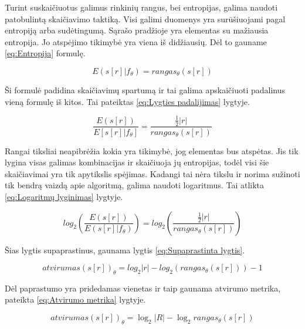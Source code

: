 \documentclass{VUMIFInfBakalaurinis}
\begin{document}
\par Turint suskaičiuotus galimus rinkinių rangus, bei entropijas, galima naudoti patobulintą skaičiavimo taktiką. Visi galimi duomenys yra surūšiuojami pagal entropiją arba sudėtingumą. Sąrašo pradžioje yra elementas su mažiausia entropija. Jo atspėjimo tikimybė yra viena iš didžiausių. Dėl to gauname \eqref{eq:Entropija} formulę.

\begin{equation}
E(s[r]|f_{\theta}) = rangas_{\theta}(s[r])
\label{eq:Entropija}
\end{equation} 

\par Ši formulė padidina skaičiavimų spartumą ir tai galima apskaičiuoti padalinus vieną formulę iš kitos. Tai pateiktas \eqref{eq:Lygties padalijimas} lygtyje.

\begin{equation}
\frac{E(s[r])}{E[s[r]|f_{\theta}]} = \frac{\frac{1}{2}|r|}{rangas_{\theta}(s[r])}
\label{eq:Lygties padalijimas}
\end{equation}

\par Rangai tiksliai neapibrėžia kokia yra tikimybė, jog elementas bus atspėtas. Jis tik lygina visas galimas kombinacijas ir skaičiuoja jų entropijas, todėl visi šie skaičiavimai yra tik apytikslis spėjimas. Kadangi tai nėra tikslu ir norima sužinoti tik bendrą vaizdą apie algoritmą, galima naudoti logaritmus. Tai atlikta \eqref{eq:Logaritmų lyginimas} lygtyje.

\begin{equation}
log_{2}(\frac{E(s[r])}{E(s[r]|f_{\theta})}) = log_{2}(\frac{\frac{1}{2}|r|}{rangas_{\theta}(s[r])})
\label{eq:Logaritmų lyginimas}
\end{equation}

\par Šias lygtis supaprastinus, gaunama lygtis \eqref{eq:Supaprastinta lygtis}.

\begin{equation}
atvirumas(s[r])_{\theta} = log_{2}|r| - log_{2}(rangas_{\theta}(s[r])) - 1
\label{eq:Supaprastinta lygtis}
\end{equation}

\par Dėl paprastumo yra pridedamas vienetas ir taip gaunama atvirumo metrika, pateikta \eqref{eq:Atvirumo metrika} lygtyje.

\begin{equation}
atvirumas(s[r])_{\theta} = \log_2 | R | - \log_2 rangas_{\theta}(s[r])
\label{eq:Atvirumo metrika}
\end{equation}
\end{document}

